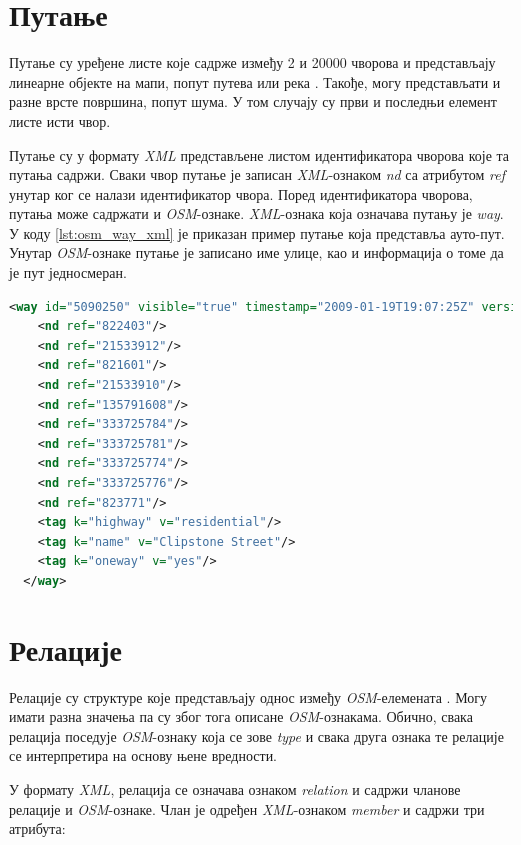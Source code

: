 \documentclass[12pt,oneside]{memoir}
\begin{document}
\section{Путање}
\label{sec:osm_ways}

Путање су уређене листе које садрже између 2 и 20000 чворова и представљају линеарне објекте на мапи, попут путева или река \cite{osm_wiki}. Такође, могу представљати и разне врсте површина, попут шума. У том случају су први и последњи елемент листе исти чвор. 

Путање су у формату \textit{XML} представљене листом идентификатора чворова које та путања садржи. Сваки чвор путање је записан \textit{XML}-ознаком \textit{nd} са атрибутом \textit{ref} унутар ког се налази идентификатор чвора. Поред идентификатора чворова, путања може садржати и \textit{OSM}-ознаке. \textit{XML}-ознака која означава путању је \textit{way}. У коду \ref{lst:osm_way_xml} је приказан пример путање која представља ауто-пут. Унутар \textit{OSM}-ознаке путање је записано име улице, као и информација о томе да је пут једносмеран.

\begin{lstlisting}[language=XML, caption={Запис \textit{XML} \textit{OSM}-путањe која представља ауто-пут}, label={lst:osm_way_xml}]
<way id="5090250" visible="true" timestamp="2009-01-19T19:07:25Z" version="8" changeset="816806" user="Blumpsy" uid="64226">
    <nd ref="822403"/>
    <nd ref="21533912"/>
    <nd ref="821601"/>
    <nd ref="21533910"/>
    <nd ref="135791608"/>
    <nd ref="333725784"/>
    <nd ref="333725781"/>
    <nd ref="333725774"/>
    <nd ref="333725776"/>
    <nd ref="823771"/>
    <tag k="highway" v="residential"/>
    <tag k="name" v="Clipstone Street"/>
    <tag k="oneway" v="yes"/>
  </way>
\end{lstlisting}

\section{Релације}
\label{sec:osm_relations}

Релације су структуре које представљају однос између \textit{OSM}-елемената \cite{osm_wiki}. Могу имати разна значења па су због тога описане \textit{OSM}-ознакама. Обично, свака релација поседује \textit{OSM}-ознаку која се зове \textit{type} и свака друга ознака те релације се интерпретира на основу њене вредности.

У формату \textit{XML}, релација се означава ознаком \textit{relation} и садржи чланове релације и \textit{OSM}-ознаке. Члан је одређен \textit{XML}-ознаком \textit{member} и садржи три атрибута:
\end{document}
